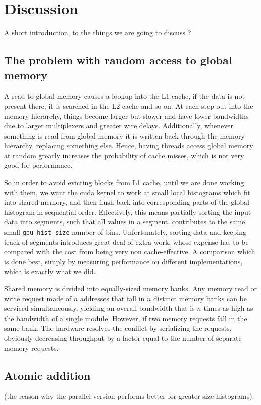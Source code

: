 \documentclass[12pt, a4paper, hidelinks]{article}
\renewcommand{\tt}[1]{\texttt{#1}}
\begin{document}
\section{Discussion}
A short introduction, to the things we are going to discuss ?


\subsection{The problem with random access to global memory}
A read to global memory causes a lookup into the L1 cache,
if the data is not present there, it is searched in the L2 cache and so on.
At each step out into the memory hierarchy,
things become larger but slower and have lower bandwidths due to larger
multiplexers and greater wire delays. Additionally,
whenever something is read from global memory it is written back
through the memory hierarchy, replacing something else.
Hence, having threads access global memory at random greatly
increases the probability of cache misses, which is not very good for performance.

So in order to avoid evicting blocks from L1 cache,
until we are done working with them, we want the cuda kernel to work at
small local histograms which fit into shared memory,
and then flush back into corresponding parts of the global histogram
in sequential order. Effectively, this means partially sorting the
input data into segments, such that all values in a segment,
contributes to the same small \tt{gpu\_hist\_size} number of bins.
Unfortunately, sorting data and keeping track of segments
introduces great deal of extra work, whose expense has to be compared
with the cost from being very non cache-effective.
A comparison which is done best,
simply by measuring performance on different implementations,
which is exactly what we did.

Shared memory is divided into equally-sized memory banks.
Any memory read or write request made of $n$ addresses that fall in $n$
distinct memory banks can be serviced simultaneously, yielding an overall bandwidth
that is $n$ times as high as the bandwidth of a single module.
However, if two memory requests fall in the same bank.
The hardware resolves the conflict by serializing the requests,
obviously decreasing throughput by a factor equal to the number of
separate memory requests.


\subsection{Atomic addition}
(the reason why the parallel version performs better for greater size histograms).
\end{document}
